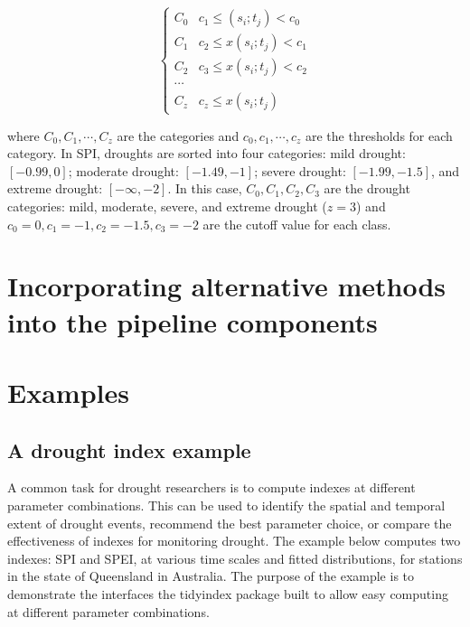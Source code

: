 \documentclass[
]{article}
\begin{document}
\begin{equation}
\begin{cases}
C_0 & c_1 \leq (s_i; t_j) < c_0 \\
C_1 & c_2 \leq x(s_i; t_j) < c_1 \\
C_2 & c_3 \leq x(s_i; t_j) < c_2 \\
\cdots \\
C_z & c_z \leq x(s_i; t_j)
\end{cases}
\end{equation}

where \(C_0, C_1,\cdots ,C_z\) are the categories and
\(c_0, c_1, \cdots, c_z\) are the thresholds for each category. In SPI,
droughts are sorted into four categories: mild drought: \([-0.99, 0]\);
moderate drought: \([-1.49, -1]\); severe drought: \([-1.99, -1.5]\),
and extreme drought: \([-\infty, -2]\). In this case,
\(C_0, C_1, C_2, C_3\) are the drought categories: mild, moderate,
severe, and extreme drought (\(z = 3\)) and
\(c_0 =0, c_1 = -1, c_2 = -1.5, c_3 = -2\) are the cutoff value for each
class.

\hypertarget{sec-incorporating-new-buliding-blocks-into-the-pipeline}{%
\section{Incorporating alternative methods into the pipeline
components}\label{sec-incorporating-new-buliding-blocks-into-the-pipeline}}

\hypertarget{sec-examples}{%
\section{Examples}\label{sec-examples}}

\newpage

\hypertarget{a-drought-index-example}{%
\subsection{A drought index example}\label{a-drought-index-example}}

A common task for drought researchers is to compute indexes at different
parameter combinations. This can be used to identify the spatial and
temporal extent of drought events, recommend the best parameter choice,
or compare the effectiveness of indexes for monitoring drought. The
example below computes two indexes: SPI and SPEI, at various time scales
and fitted distributions, for stations in the state of Queensland in
Australia. The purpose of the example is to demonstrate the interfaces
the tidyindex package built to allow easy computing at different
parameter combinations.
\end{document}
